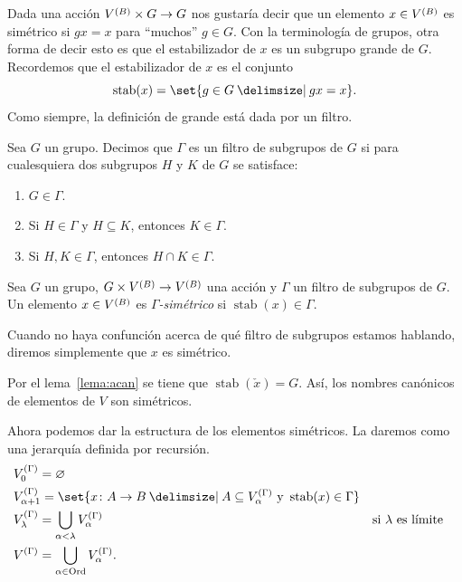 \documentclass[letterpaper,DIV=15,12pt]{scrartcl}
\renewcommand{\emptyset}{\varnothing}
\DeclareMathOperator{\stab}{stab}                          %
\newcommand{\st}{}
\newcommand{\SetSymbol}[1][]{%
\nonscript\:#1\vert
\allowbreak
\nonscript\:
\mathopen{}}
\renewcommand\st{\SetSymbol[\delimsize]}
\begin{document}
Dada una acción \(\mb\times G\to G\) nos gustaría decir que un elemento
\(x\in\mb\) es simétrico si \(gx=x\) para \enquote{muchos} \(g\in G\). Con la
terminología de grupos, otra forma de decir esto es que el estabilizador de
\(x\) es un subgrupo grande de \(G\). Recordemos que el estabilizador de \(x\)
es el conjunto
\begin{equation*}
    \stab(x)=\set{g\in G\st gx=x}.
\end{equation*}
Como siempre, la definición de grande está dada por un filtro.

\begin{definition}
    Sea \(G\) un grupo. Decimos que \(\Gamma\) es un filtro de subgrupos de
    \(G\) si para cualesquiera dos subgrupos \(H\) y \(K\) de \(G\) se
    satisface:
    \begin{enumerate}
        \item \(G\in\Gamma\).
        \item Si \(H\in\Gamma\) y \(H\subseteq K\), entonces \(K\in\Gamma\).
        \item Si \(H,K\in\Gamma\), entonces \(H\cap K\in\Gamma\).
    \end{enumerate}
\end{definition}

\begin{definition}
    Sea \(G\) un grupo, \(G\times\mb\to\mb\) una acción y \(\Gamma\) un filtro
    de subgrupos de \(G\). Un elemento \(x\in\mb\)
    es \emph{\(\Gamma\)-simétrico} si \(\stab(x)\in\Gamma\).
\end{definition}

Cuando no haya confunción acerca de qué filtro de subgrupos estamos hablando,
diremos simplemente que \(x\) es simétrico.

Por el lema~\ref{lema:acan} se tiene que \(\stab(\check{x})=G\). Así, los
nombres canónicos de elementos de \(V\) son simétricos.

Ahora podemos dar la estructura de los elementos simétricos. La daremos como una
jerarquía definida por recursión.
\begin{align*}
    &V^{(\Gamma)}_0=\emptyset\\
    &V^{(\Gamma)}_{\alpha+1}
    =\set{x\colon A\to B\st A\subseteq V^{(\Gamma)}_\alpha \text{ y } \stab(x)\in\Gamma}\\
    &V^{(\Gamma)}_{\lambda}=\bigcup_{\alpha<\lambda}V^{(\Gamma)}_{\alpha} 
    &&\text{si \(\lambda\) es límite}\\
    &V^{(\Gamma)}=\bigcup_{\alpha\in\mathrm{Ord}}V^{(\Gamma)}_\alpha.
\end{align*}
\end{document}

